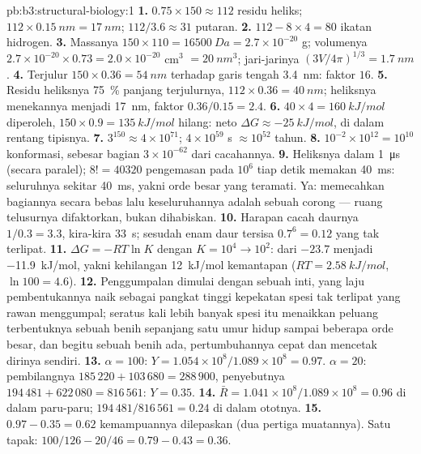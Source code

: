 \begin{solution}{pb:b3:structural-biology:1}
\textbf{1.} $0.75\times 150 \approx 112$ residu heliks; $112\times
\qty{0.15}{nm} = \qty{17}{nm}$; $112/3.6 \approx 31$ putaran.
\textbf{2.} $112 - 8\times 4 = 80$ ikatan hidrogen.
\textbf{3.} Massanya $150\times 110 = \qty{16500}{Da} = 2.7\times 10^{-20}$
g; volumenya $2.7\times 10^{-20}\times 0.73 = 2.0\times 10^{-20}$ cm$^{3}$
$= \qty{20}{nm^3}$; jari-jarinya $(3V/4\pi)^{1/3} = \qty{1.7}{nm}$.
\textbf{4.} Terjulur $150\times 0.36 = \qty{54}{nm}$ terhadap garis tengah
\qty{3.4}{nm}: faktor $16$.
\textbf{5.} Residu heliksnya \qty{75}{\%} panjang terjulurnya,
$112\times 0.36 = \qty{40}{nm}$; heliksnya menekannya menjadi
\qty{17}{nm}, faktor $0.36/0.15 = 2.4$.
\textbf{6.} $40\times 4 = \qty{160}{kJ/mol}$ diperoleh, $150\times 0.9 =
\qty{135}{kJ/mol}$ hilang: neto $\Delta G \approx \qty{-25}{kJ/mol}$, di
dalam rentang tipisnya.
\textbf{7.} $3^{150} \approx 4\times 10^{71}$; $4\times 10^{59}$ s
$\approx 10^{52}$ tahun.
\textbf{8.} $10^{-2}\times 10^{12} = 10^{10}$ konformasi, sebesar bagian
$3\times 10^{-62}$ dari cacahannya.
\textbf{9.} Heliksnya dalam \qty{1}{\micro s} (secara paralel); $8! = \num{40320}$
pengemasan pada $10^{6}$ tiap detik memakan \qty{40}{ms}: seluruhnya sekitar
\qty{40}{ms}, yakni orde besar yang teramati. Ya: memecahkan bagiannya
secara bebas lalu keseluruhannya adalah sebuah corong --- ruang telusurnya
difaktorkan, bukan dihabiskan.
\textbf{10.} Harapan cacah daurnya $1/0.3 = 3.3$, kira-kira \qty{33}{s};
sesudah enam daur tersisa $0.7^{6} = 0.12$ yang tak terlipat.
\textbf{11.} $\Delta G = -RT\ln K$ dengan $K = 10^{4} \to 10^{2}$: dari
$-23.7$ menjadi \qty{-11.9}{kJ/mol}, yakni kehilangan \qty{12}{kJ/mol}
kemantapan ($RT = \qty{2.58}{kJ/mol}$, $\ln 100 = 4.6$).
\textbf{12.} Penggumpalan dimulai dengan sebuah inti, yang laju
pembentukannya naik sebagai pangkat tinggi kepekatan spesi tak terlipat yang
rawan menggumpal; seratus kali lebih banyak spesi itu menaikkan peluang
terbentuknya sebuah benih sepanjang satu umur hidup sampai beberapa orde besar,
dan begitu sebuah benih ada, pertumbuhannya cepat dan mencetak dirinya sendiri.
\textbf{13.} $\alpha = 100$: $Y = 1.054\times 10^{8}/1.089\times 10^{8} =
0.97$. $\alpha = 20$: pembilangnya $185\,220 + 103\,680 = 288\,900$,
penyebutnya $194\,481 + 622\,080 = 816\,561$: $Y = 0.35$.
\textbf{14.} $\bar R = 1.041\times 10^{8}/1.089\times 10^{8} = 0.96$ di
dalam paru-paru; $194\,481/816\,561 = 0.24$ di dalam ototnya.
\textbf{15.} $0.97 - 0.35 = 0.62$ kemampuannya dilepaskan (dua pertiga
muatannya). Satu tapak: $100/126 - 20/46 = 0.79 - 0.43 = 0.36$.

\end{solution}
